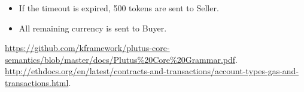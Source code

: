 \documentclass[a4paper]{article}
\begin{document}
\begin{itemize}
\begin{enumerate}
\begin{itemize}
        \item If the timeout is expired, 500 tokens are sent to Seller.

        \item All remaining currency is sent to Buyer.
      \end{itemize}
  \end{enumerate}

  \end{itemize}

  \begin{thebibliography}{50}
     \url{https://github.com/kframework/plutus-core-semantics/blob/master/docs/Plutus%20Core%20Grammar.pdf}.
     \url{http://ethdocs.org/en/latest/contracts-and-transactions/account-types-gas-and-transactions.html}.
  \end{thebibliography}
\end{document}
